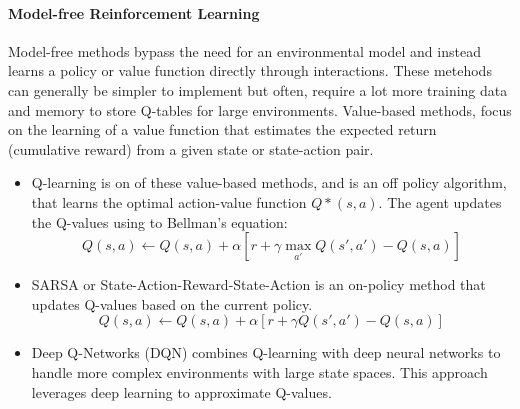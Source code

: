 \paragraph{Model-free Reinforcement Learning}
Model-free methods bypass the need for an environmental model and instead
learns a policy or value function directly through interactions. These metehods
can generally be simpler to implement but often, require a lot more training data 
and memory to store Q-tables for large environments.
Value-based methods, focus on the learning of a value function that estimates 
the expected return (cumulative reward) from a given state or state-action pair.
\begin{itemize}
      \item Q-learning is on of these value-based methods, and is an off policy algorithm,
      that learns the optimal action-value function \(Q*(s,a) \). The agent updates the 
      Q-values using to Bellman's equation: \cite{Types-of-Reinforcement-Learning}
      \begin{equation}
            Q(s,a) \leftarrow Q(s,a) + \alpha [r + \gamma \max_{a'} Q(s',a') - Q(s,a)]
      \end{equation}
      \item SARSA or State-Action-Reward-State-Action is an on-policy method that 
      updates Q-values based on the current policy. \cite{SARSA}
      \begin{equation}
            Q(s,a) \leftarrow Q(s,a) + \alpha [r + \gamma Q(s',a') - Q(s,a)]
      \end{equation}
      \item Deep Q-Networks (DQN) combines Q-learning with deep neural networks 
      to handle more complex environments with large state spaces. This approach leverages deep learning 
      to approximate Q-values. \cite{Types-of-Reinforcement-Learning}
\end{itemize}


